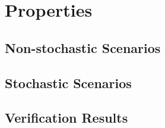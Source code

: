 
\section{Properties}

\subsection{Non-stochastic Scenarios}

\subsection{Stochastic Scenarios}

\subsection{Verification Results}